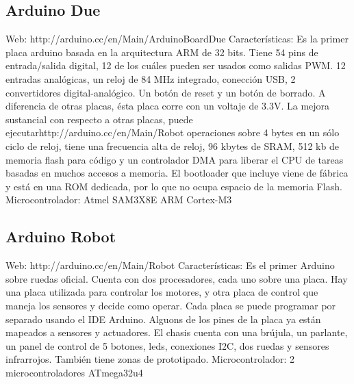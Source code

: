 \subsection{Arduino Due}
Web: 
http://arduino.cc/en/Main/ArduinoBoardDue
Características:
Es la primer placa arduino basada en la arquitectura ARM de 32 bits. Tiene 54 pins de entrada/salida digital, 12 de los cuáles pueden ser usados como salidas PWM. 12 entradas analógicas, un reloj de 84 MHz integrado, conección USB, 2 convertidores digital-analógico. Un botón de reset y un botón de borrado.
A diferencia de otras placas, ésta placa corre con un voltaje de 3.3V.
La mejora sustancial con respecto a otras placas, puede ejecutarhttp://arduino.cc/en/Main/Robot operaciones sobre 4 bytes en un sólo ciclo de reloj, tiene una frecuencia alta de reloj, 96 kbytes de SRAM, 512 kb de memoria flash para código y un controlador DMA para liberar el CPU de tareas basadas en muchos accesos a memoria.
El bootloader que incluye viene de fábrica y está en una ROM dedicada, por lo que no ocupa espacio de la memoria Flash.
Microcontrolador:
Atmel SAM3X8E ARM Cortex-M3

\subsection{Arduino Robot}
Web:
http://arduino.cc/en/Main/Robot
Características:
Es el primer Arduino sobre ruedas oficial. Cuenta con dos procesadores, cada uno sobre una placa. Hay una placa utilizada para controlar los motores, y otra placa de control que maneja los sensores y decide como operar.
Cada placa se puede programar por separado usando el IDE Arduino. Alguons de los pines de la placa ya están mapeados a sensores y actuadores.
El chasis cuenta con una brújula, un parlante, un panel de control de 5 botones, leds, conexiones I2C, dos ruedas y sensores infrarrojos. También tiene zonas de prototipado.
Microcontrolador:
2 microcontroladores ATmega32u4


